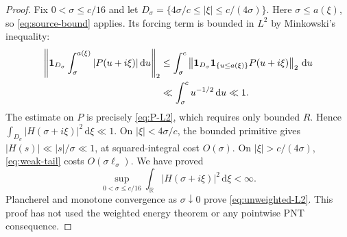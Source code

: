 \documentclass[11pt,letterpaper]{article}
\numberwithin{equation}{section}
\theoremstyle{definition}
\theoremstyle{remark}
\newcommand{\R}{\mathbb R}
\newcommand{\ind}{\mathbf 1}
\newcommand{\dd}{\,\mathrm d}
\newcommand{\norm}[1]{\left\lVert#1\right\rVert}
\begin{document}
\begin{proof}
Fix $0<\sigma\le c/16$ and let
$D_\sigma=\{4\sigma/c\le|\xi|\le c/(4\sigma)\}$.
Here $\sigma\le a(\xi)$, so \eqref{eq:source-bound} applies. Its forcing
term is bounded in $L^2$ by Minkowski's inequality:
\begin{align}
 \left\|\ind_{D_\sigma}\int_\sigma^{a(\xi)}|P(u+i\xi)|\dd u\right\|_2
 &\le\int_\sigma^c
       \norm{\ind_{D_\sigma}\ind_{\{u\le a(\xi)\}}P(u+i\xi)}_2\dd u
 \notag\\
 &\ll\int_\sigma^c u^{-1/2}\dd u\ll1.\label{eq:weak-force}
\end{align}
The estimate on $P$ is precisely \eqref{eq:P-L2}, which requires only
bounded $R$. Hence $\int_{D_\sigma}|H(\sigma+i\xi)|^2\dd\xi\ll1$.
On $|\xi|<4\sigma/c$, the bounded primitive gives
$|H(s)|\ll|s|/\sigma\ll1$, at squared-integral cost $O(\sigma)$.
On $|\xi|>c/(4\sigma)$, \eqref{eq:weak-tail} costs
$O(\sigma\ell_\sigma)$. We have proved
\[
 \sup_{0<\sigma\le c/16}\int_\R|H(\sigma+i\xi)|^2\dd\xi<\infty.
\]
Plancherel and monotone convergence as $\sigma\downarrow0$ prove
\eqref{eq:unweighted-L2}. This proof has not used the weighted energy
theorem or any pointwise PNT consequence.
\end{proof}
\end{document}
